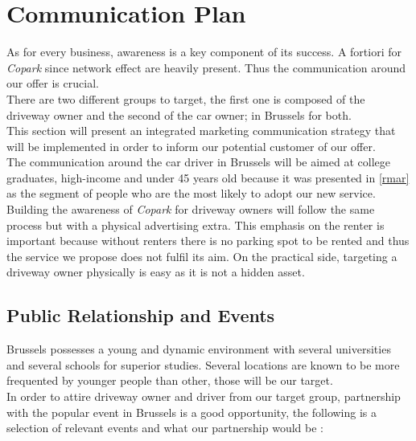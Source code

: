 \documentclass[12pt,a4paper,oneside]{book}
\newcommand{\bp}{\textit{Copark }}
\begin{document}
\section{Communication Plan}

As for every business, awareness is a key component of its success. A fortiori for \bp since network effect are heavily present. Thus the communication around our offer is crucial.\\
There are two different groups to target, the first one is composed of the driveway owner and the second of the car owner; in Brussels for both.\\
This section will present an integrated marketing communication strategy that will be implemented in order to inform our potential customer of our offer.\\
The communication around the car driver in Brussels will be aimed at college graduates, high-income and under 45 years old because it was presented in \autoref{rmar} as the segment of people who are the most likely to adopt our new service. Building the awareness of \bp for driveway owners will follow the same process but with a physical advertising extra. This emphasis on the renter is important because without renters there is no parking spot to be rented and thus the service we propose does not fulfil its aim. On the practical side, targeting a driveway owner physically is easy as it is not a hidden asset.

\subsection{Public Relationship and Events}
Brussels possesses a young and dynamic environment with several universities and several schools for superior studies. Several locations are known to be more frequented by younger people than other, those will be our target.\\
In order to attire driveway owner and driver from our target group, partnership with the popular event in Brussels is a good opportunity, the following is a selection of relevant events and what our partnership would be :
\end{document}
